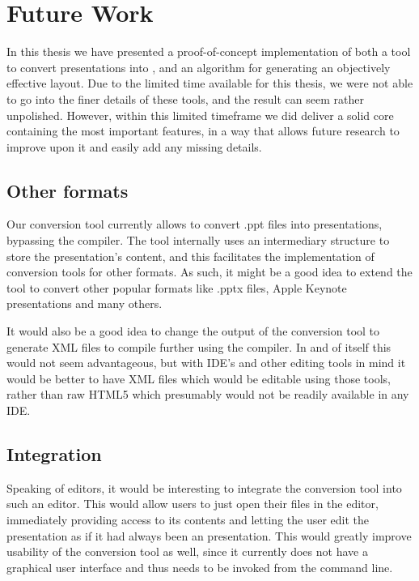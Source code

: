   \section{Future Work}
   \label{future}

   In this thesis we have presented a proof-of-concept implementation of both a
   tool to convert \ppt presentations into \mxp, and an algorithm for
   generating an objectively effective layout. Due to the limited time
   available for this thesis, we were not able to go into the finer details of
   these tools, and the result can seem rather unpolished. However, within this
   limited timeframe we did deliver a solid core containing the most important
   features, in a way that allows future research to improve upon it and easily
   add any missing details.

   \subsection{Other formats}

    Our conversion tool currently allows to convert \ppt .ppt files into \mxp
    presentations, bypassing the \mxp compiler. The tool internally uses an
    intermediary structure to store the presentation's content, and this
    facilitates the implementation of conversion tools for other formats. As
    such, it might be a good idea to extend the tool to convert other popular
    formats like \ppt .pptx files, Apple Keynote presentations and many others.

    It would also be a good idea to change the output of the conversion tool to
    generate \mxp XML files to compile further using the \mxp compiler. In and
    of itself this would not seem advantageous, but with \mxp IDE's and other
    editing tools in mind it would be better to have XML files which would be
    editable using those tools, rather than raw HTML5 which presumably would
    not be readily available in any IDE.

   \subsection{Integration}

    Speaking of editors, it would be interesting to integrate the conversion
    tool into such an editor. This would allow \mxp users to just open their
    \ppt files in the \mxp editor, immediately providing access to its contents
    and letting the user edit the presentation as if it had always been an \mxp
    presentation. This would greatly improve usability of the conversion tool
    as well, since it currently does not have a graphical user interface and
    thus needs to be invoked from the command line.

